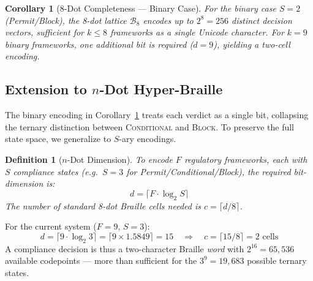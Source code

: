 \documentclass[11pt,twocolumn]{article}
\newtheorem{definition}{Definition}
\newtheorem{corollary}[theorem]{Corollary}
\begin{document}
\begin{corollary}[8-Dot Completeness --- Binary Case]
\label{cor:8dot}
For the \emph{binary} case $S=2$ (Permit/Block), the 8-dot lattice
$\mathcal{B}_8$ encodes up to $2^8 = 256$ distinct decision vectors,
sufficient for $k \leq 8$ frameworks as a single Unicode character.
For $k = 9$ binary frameworks, one additional bit is required ($d=9$),
yielding a two-cell encoding.
\end{corollary}

\subsection{Extension to $n$-Dot Hyper-Braille}
\label{sec:ndot}

The binary encoding in Corollary~\ref{cor:8dot} treats each verdict as
a single bit, collapsing the ternary distinction between \textsc{Conditional}
and \textsc{Block}. To preserve the full state space, we generalize
to $S$-ary encodings.

\begin{definition}[$n$-Dot Dimension]
To encode $F$ regulatory frameworks, each with $S$ compliance states
(\emph{e.g.}\ $S=3$ for Permit/Conditional/Block), the required
bit-dimension is:
\begin{equation}
  d = \lceil F \cdot \log_2 S \rceil
  \label{eq:ndot-dim}
\end{equation}
The number of standard 8-dot Braille cells needed is
$c = \lceil d / 8 \rceil$.
\end{definition}

For the current system ($F=9$, $S=3$):
\begin{equation}
  d = \lceil 9 \cdot \log_2 3 \rceil = \lceil 9 \times 1.5849 \rceil = 15
  \quad \Longrightarrow \quad
  c = \lceil 15/8 \rceil = 2 \text{ cells}
\end{equation}
A compliance decision is thus a two-character Braille \emph{word}
with $2^{16} = 65{,}536$ available codepoints --- more than sufficient
for the $3^9 = 19{,}683$ possible ternary states.
\end{document}
